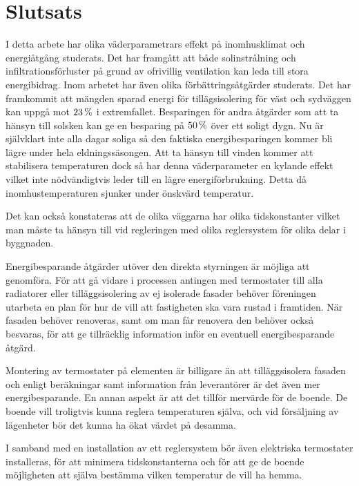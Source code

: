 \chapter{Slutsats}


I detta arbete har olika väderparametrars effekt på inomhusklimat och energiåtgång studerats.
Det har framgått att både solinstrålning och infiltrationsförluster på grund av ofrivillig
ventilation kan leda till stora energibidrag. Inom arbetet har även olika förbättringsåtgärder
studerats. Det har framkommit att mängden sparad energi för tillägsisolering för väst och sydväggen
kan uppgå mot $\unit[23]{\%}$ i extremfallet. Besparingen för andra åtgärder som att ta hänsyn till solsken
kan ge en besparing på $\unit[50]{\%}$ över ett soligt dygn.  Nu är självklart inte alla dagar soliga
så den faktiska energibesparingen kommer bli lägre under hela eldningssäsongen.
Att ta hänsyn till vinden kommer att stabilisera
temperaturen dock så har denna väderparameter en kylande effekt vilket inte nödvändigtvis leder
till en lägre energiförbrukning. Detta då inomhustemperaturen sjunker under önskvärd temperatur. 

Det kan också konstateras att de olika väggarna har olika tidskonstanter vilket man måste ta hänsyn till vid regleringen med olika reglersystem för olika delar i byggnaden.

Energibesparande åtgärder utöver den direkta styrningen är möjliga att genomföra. För att gå vidare i processen antingen med termostater till alla radiatorer eller tilläggsisolering av ej isolerade fasader behöver föreningen utarbeta en plan för hur de vill att fastigheten ska vara rustad i framtiden. När fasaden behöver renoveras, samt om man får renovera den behöver också besvaras, för att ge tillräcklig information inför en eventuell energibesparande åtgärd. 

Montering av termostater på elementen är billigare än att tilläggsisolera fasaden och enligt beräkningar samt information från leverantörer är det även mer energibesparande. En annan aspekt är att det tillför mervärde för de boende. De boende vill troligtvis kunna reglera temperaturen själva, och vid försäljning av lägenheter bör det kunna ha ökat värdet på desamma.

I samband med en installation av ett reglersystem bör även elektriska termostater installeras, för att minimera tidskonstanterna och för att ge de boende möjligheten att själva bestämma vilken temperatur de vill ha hemma.

